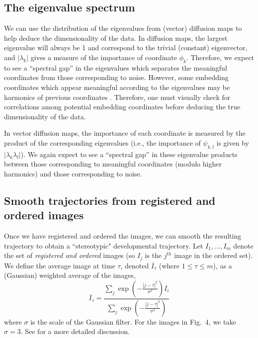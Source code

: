 \documentclass{pnastwo}
\newcommand{\fig}[0]{Fig.}
\begin{document}
\begin{article}
\subsection{The eigenvalue spectrum}

We can use the distribution of the eigenvalues from (vector) diffusion maps to help deduce the dimensionality of the data.
%
In diffusion maps, the largest eigenvalue will always be 1 and correspond to the trivial (constant) eigenvector, and $|\lambda_k|$ gives a measure of the importance of coordinate $\phi_k$. 
%
Therefore, we expect to see a ``spectral gap'' in the eigenvalues which separates the meaningful coordinates from those corresponding to noise.
%
However, some embedding coordinates which appear meaningful according to the eigenvalues may be harmonics of previous coordinates \cite{ferguson2010systematic}.
%
Therefore, one must visually check for correlations among potential embedding coordinates before deducing the true dimensionality of the data. 

In vector diffusion maps, the importance of each coordinate is measured by the product of the corresponding eigenvalues (i.e., the importance of $\psi_{k,l}$ is given by $| \lambda_k \lambda_l |$). 
%
We again expect to see a ``spectral gap'' in these eigenvalue products between those corresponding to meaningful coordinates (modulo higher harmonics) and those corresponding to noise. 


\subsection{Smooth trajectories from registered and ordered images}

Once we have registered and ordered the images, we can smooth the resulting trajectory to obtain a ``stereotypic" developmental trajectory.
%
Let $I_1, \dots, I_m$ denote the set of {\em registered and ordered} images (so $I_j$ is the $j^{th}$ image in the ordered set).
%
We define the average image at time $\tau$, denoted $\overline{I}_{\tau}$ (where $1 \le \tau \le m$), as a (Gaussian) weighted average of the images,
\begin{equation}
\overline{I}_{\tau} =  \frac{\sum_j \exp \left( - \frac{|j - \tau|^2}{\sigma^2} \right) I_i}{\sum_j \exp \left( - \frac{|j - \tau|^2}{\sigma^2} \right) }
\end{equation}
where $\sigma$ is the scale of the Gaussian filter.
%
For the images in \fig~4, we take $\sigma = 3$.
%
See \cite{kemelmacher2011exploring} for a more detailed discussion.






\end{article}
\end{document}
